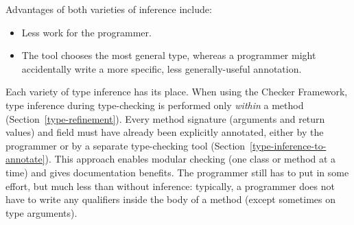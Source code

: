 Advantages of both varieties of inference include:
\begin{itemize}
\item
  Less work for the programmer.
\item
  The tool chooses the most general type, whereas a programmer might
  accidentally write a more specific, less generally-useful annotation.
\end{itemize}


Each variety of type inference has its place.  When using the Checker
Framework, type inference during type-checking is performed only
\emph{within} a method (Section~\ref{type-refinement}).  Every method
signature (arguments and return values) and field must have already been explicitly annotated,
either by the programmer or by a separate type-checking tool
(Section~\ref{type-inference-to-annotate}).
This approach enables modular checking (one class or method at a time) and
gives documentation benefits.
The programmer still has to
put in some effort, but much less than without inference:  typically, a
programmer does not have to write any qualifiers
inside the body of a method (except sometimes on type arguments).



